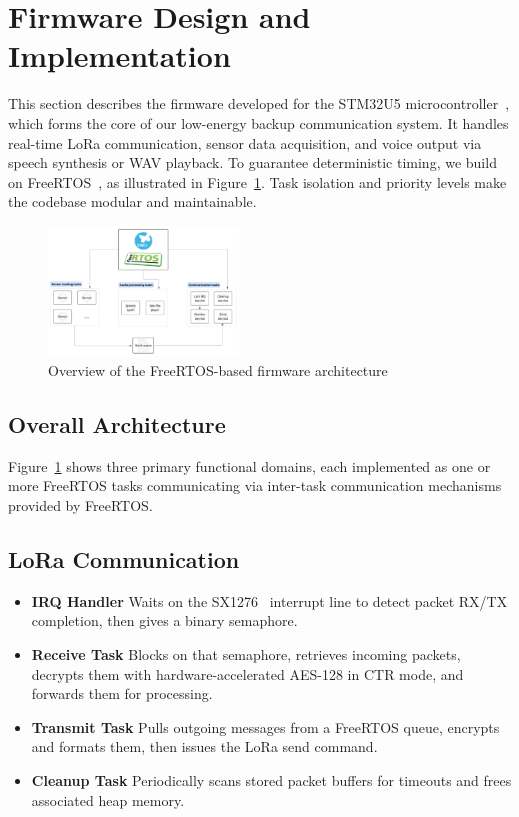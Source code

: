 \section{Firmware Design and Implementation}

This section describes the firmware developed for the STM32U5 microcontroller~\cite{stm32u5}, which forms the core of our low-energy backup communication system. It handles real-time LoRa communication, sensor data acquisition, and voice output via speech synthesis or WAV playback. To guarantee deterministic timing, we build on FreeRTOS~\cite{freertos}, as illustrated in Figure~\ref{fig:firmware-system}. Task isolation and priority levels make the codebase modular and maintainable.

\begin{figure}[H]
\centering
\includegraphics[width=0.45\textwidth]{images/firmware-system-design.png}
\caption{Overview of the FreeRTOS-based firmware architecture}\label{fig:firmware-system}
\end{figure}

\subsection{Overall Architecture}

Figure~\ref{fig:firmware-system} shows three primary functional domains, each implemented as one or more FreeRTOS tasks communicating via inter-task communication mechanisms provided by FreeRTOS.

\subsection{LoRa Communication}
\begin{itemize}
  \item \textbf{IRQ Handler}
    Waits on the SX1276~\cite{sx1276} interrupt line to detect packet RX/TX completion, then gives a binary semaphore.
  \item \textbf{Receive Task}
    Blocks on that semaphore, retrieves incoming packets, decrypts them with hardware-accelerated AES-128 in CTR mode, and forwards them for processing.  
  \item \textbf{Transmit Task}
    Pulls outgoing messages from a FreeRTOS queue, encrypts and formats them, then issues the LoRa send command.
  \item \textbf{Cleanup Task}
    Periodically scans stored packet buffers for timeouts and frees associated heap memory.
\end{itemize}

